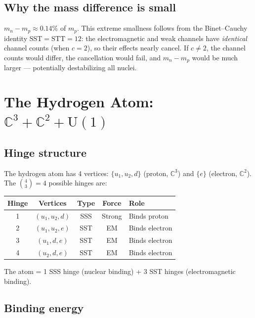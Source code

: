 \documentclass[12pt]{article}
\theoremstyle{remark}
\begin{document}
\subsection{Why the mass difference is small}

$m_n - m_p \approx 0.14\%$ of $m_p$. This extreme smallness follows from the Binet--Cauchy identity $\text{SST} = \text{STT} = 12$: the electromagnetic and weak channels have \emph{identical} channel counts (when $c = 2$), so their effects nearly cancel. If $c \neq 2$, the channel counts would differ, the cancellation would fail, and $m_n - m_p$ would be much larger --- potentially destabilizing all nuclei.

\section{The Hydrogen Atom: $\mathbb{C}^3 + \mathbb{C}^2 + \text{U}(1)$}

\subsection{Hinge structure}

The hydrogen atom has 4 vertices: $\{u_1, u_2, d\}$ (proton, $\mathbb{C}^3$) and $\{e\}$ (electron, $\mathbb{C}^2$). The $\binom{4}{3} = 4$ possible hinges are:

\begin{center}
\begin{tabular}{ccccl}
\hline
Hinge & Vertices & Type & Force & Role \\
\hline
1 & $(u_1, u_2, d)$ & SSS & Strong & Binds proton \\
2 & $(u_1, u_2, e)$ & SST & EM & Binds electron \\
3 & $(u_1, d, e)$ & SST & EM & Binds electron \\
4 & $(u_2, d, e)$ & SST & EM & Binds electron \\
\hline
\end{tabular}
\end{center}

The atom = 1 SSS hinge (nuclear binding) + 3 SST hinges (electromagnetic binding).

\subsection{Binding energy}
\end{document}
